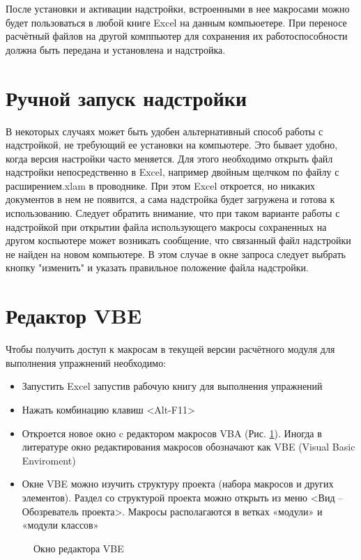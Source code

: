 После установки и активации надстройки, встроенными в нее макросами можно будет пользоваться в любой книге Excel на данным компьюетере. При переносе расчётный файлов на другой комппьютер для сохранения их работоспособности должна быть передана и установлена и надстройка. 

\section{Ручной запуск надстройки}
В некоторых случаях может быть удобен альтернативный способ работы с надстройкой, не требующий ее установки на компьютере. Это бывает удобно, когда версия настройки часто меняется. Для этого необходимо открыть файл надстройки непосредственно в Excel, например двойным щелчком по файлу с расширением.xlam в проводнике. При этом Excel откроется, но никаких документов в нем не появится, а сама надстройка будет загружена и готова к использованию. Следует обратить внимание, что при таком варианте работы с надстройкой при открытии файла использующего макросы \unf{} сохраненных на другом коспьютере может возникать сообщение, что связанный файл надстройки не найден на новом компьютере. В этом случае в окне запроса следует выбрать кнопку "изменить" и указать правильное положение файла надстройки.

\section{Редактор VBE}
Чтобы получить доступ к макросам в текущей версии расчётного модуля для выполнения упражнений необходимо:
\begin{itemize}
	\item Запустить Excel запустив рабочую книгу для выполнения упражнений
	\item Нажать комбинацию клавиш <Alt-F11>
	\item Откроется новое окно c редактором макросов VBA (Рис. \ref{ris:VBA_overview}). Иногда в литературе окно редактирования макросов обозначают как VBE (Visual Basic Enviroment)
	\item Окне VBE можно изучить структуру проекта (набора макросов и других элементов). Раздел со структурой проекта можно открыть из меню <Вид – Обозреватель проекта>. Макросы располагаются в ветках «модули» и «модули классов»
	 
\end{itemize}

\begin{figure}[ht]
	\caption{Окно редактора VBE}
	\label{ris:VBA_overview}
\end{figure}


